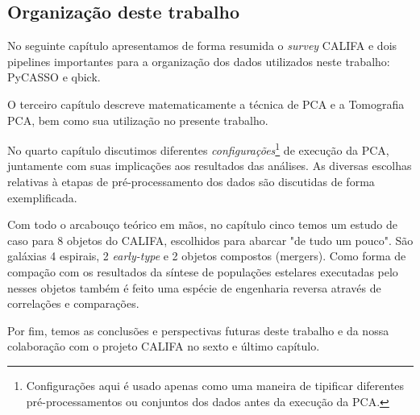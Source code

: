 \subsection{Organização deste trabalho}

No seguinte capítulo apresentamos de forma resumida o {\em survey} CALIFA e dois pipelines importantes para a
organização dos dados utilizados neste trabalho: PyCASSO e {\sc qbick}.

O terceiro capítulo descreve matematicamente a técnica de PCA e a Tomografia PCA, bem como sua utilização no presente trabalho. 

No quarto capítulo discutimos diferentes {\em configurações}\footnote{Configurações aqui é usado apenas como uma maneira
de tipificar diferentes pré-processamentos ou conjuntos dos dados antes da execução da PCA.} de execução da PCA,
juntamente com suas implicações aos resultados das análises. As diversas escolhas relativas à etapas de
pré-processamento dos dados são discutidas de forma exemplificada.

Com todo o arcabouço teórico em mãos, no capítulo cinco temos um estudo de caso para 8 objetos do CALIFA, escolhidos
para abarcar "de tudo um pouco". São galáxias 4 espirais, 2 {\em early-type} e 2 objetos compostos (mergers). Como
forma de compação com os resultados da síntese de populações estelares executadas pelo \starlight nesses objetos também
é feito uma espécie de engenharia reversa através de correlações e comparações.

Por fim, temos as conclusões e perspectivas futuras deste trabalho e da nossa colaboração com o projeto CALIFA no sexto
e último capítulo. 


